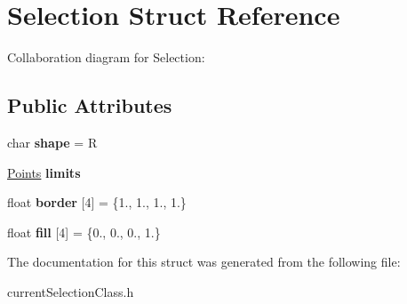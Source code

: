 \hypertarget{structSelection}{}\section{Selection Struct Reference}
\label{structSelection}


Collaboration diagram for Selection\+:
\subsection*{Public Attributes}
\begin{DoxyCompactItemize}
\item 
char {\bfseries shape} = \textquotesingle{}R\textquotesingle{}\hypertarget{structSelection_a6b9d16451b52d8eb3f43fbfbf6713296}{}\label{structSelection_a6b9d16451b52d8eb3f43fbfbf6713296}

\item 
\hyperlink{structPoints}{Points} {\bfseries limits}\hypertarget{structSelection_aadcbb75c8b429c35f8f786ebedd9180b}{}\label{structSelection_aadcbb75c8b429c35f8f786ebedd9180b}

\item 
float {\bfseries border} \mbox{[}4\mbox{]} = \{1., 1., 1., 1.\}\hypertarget{structSelection_aee24f7be8d3ab07aca1d3696430bf945}{}\label{structSelection_aee24f7be8d3ab07aca1d3696430bf945}

\item 
float {\bfseries fill} \mbox{[}4\mbox{]} = \{0., 0., 0., 1.\}\hypertarget{structSelection_ae21f6198dd03468245c1beb04118a220}{}\label{structSelection_ae21f6198dd03468245c1beb04118a220}

\end{DoxyCompactItemize}


The documentation for this struct was generated from the following file\+:\begin{DoxyCompactItemize}
\item 
current\+Selection\+Class.\+h\end{DoxyCompactItemize}
